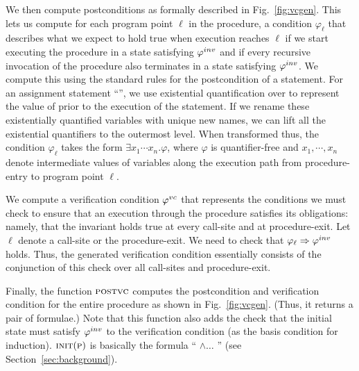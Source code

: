 We then compute postconditions as formally described in Fig.~\ref{fig:vcgen}.
This lets us compute for each program point $\ell$ in the procedure,
a condition $\varphi_{\ell}$ that describes what we expect to hold true when execution reaches $\ell$ if we start
executing the procedure in a state satisfying $\varphi^{inv}$ and if every recursive invocation of the procedure also
terminates in a state satisfying $\varphi^{inv}$. We compute this using the standard rules for the postcondition of a statement.
%
For an assignment statement ``'', we use existential quantification over  to represent the value
of  prior to the execution of the statement. If we rename these existentially quantified variables with unique new
names, we can lift all the existential quantifiers to the outermost level. When transformed thus, the condition $\varphi_{\ell}$
takes the form $\exists x_1 \cdots x_n. \varphi$, where $\varphi$ is quantifier-free and $x_1, \cdots, x_n$ denote
intermediate values of variables along the execution path from procedure-entry to program point $\ell$.

We compute a verification condition $\varphi^{vc}$ that represents the conditions we must check to ensure that
an execution through the procedure satisfies its obligations: namely, that the invariant holds true at every call-site
and at procedure-exit. Let $\ell$ denote a call-site or the procedure-exit. We need to check that $\varphi_{\ell} \Rightarrow \varphi^{inv}$
holds. Thus, the generated verification condition essentially consists of the conjunction of this check over all call-sites
and procedure-exit.

Finally, the function $\textsc{postvc}$ computes the postcondition and verification condition for the entire procedure as shown
in Fig.~\ref{fig:vcgen}. (Thus, it returns a pair of formulae.)
Note that this function also adds the check that the initial state must satisfy $\varphi^{inv}$ to the verification condition
(as the basis condition for induction). $\textsc{init}(\textsc{p})$ is basically the formula  ``
$\wedge \ldots$ '' (see Section~\ref{sec:background}).

